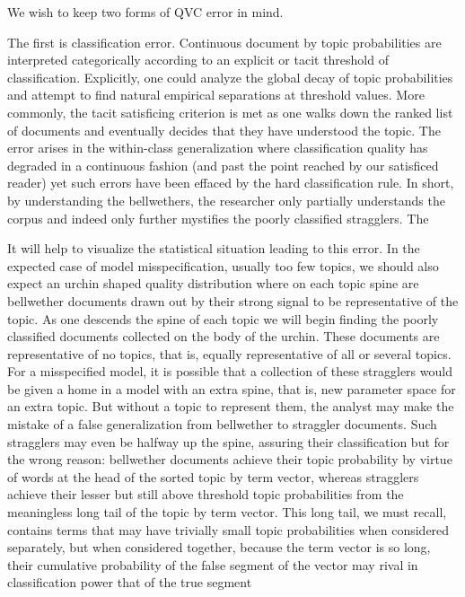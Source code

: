 \documentclass[]{book}
\theoremstyle{definition}
\theoremstyle{definition}
\theoremstyle{definition}
\theoremstyle{remark}
\begin{document}
We wish to keep two forms of QVC error in mind.

The first is classification error. Continuous document by topic
probabilities are interpreted categorically according to an explicit or
tacit threshold of classification. Explicitly, one could analyze the
global decay of topic probabilities and attempt to find natural
empirical separations at threshold values. More commonly, the tacit
satisficing criterion is met as one walks down the ranked list of
documents and eventually decides that they have understood the topic.
The error arises in the within-class generalization where classification
quality has degraded in a continuous fashion (and past the point reached
by our satisficed reader) yet such errors have been effaced by the hard
classification rule. In short, by understanding the bellwethers, the
researcher only partially understands the corpus and indeed only further
mystifies the poorly classified stragglers. The

It will help to visualize the statistical situation leading to this
error. In the expected case of model misspecification, usually too few
topics, we should also expect an urchin shaped quality distribution
where on each topic spine are bellwether documents drawn out by their
strong signal to be representative of the topic. As one descends the
spine of each topic we will begin finding the poorly classified
documents collected on the body of the urchin. These documents are
representative of no topics, that is, equally representative of all or
several topics. For a misspecified model, it is possible that a
collection of these stragglers would be given a home in a model with an
extra spine, that is, new parameter space for an extra topic. But
without a topic to represent them, the analyst may make the mistake of a
false generalization from bellwether to straggler documents. Such
stragglers may even be halfway up the spine, assuring their
classification but for the wrong reason: bellwether documents achieve
their topic probability by virtue of words at the head of the sorted
topic by term vector, whereas stragglers achieve their lesser but still
above threshold topic probabilities from the meaningless long tail of
the topic by term vector. This long tail, we must recall, contains terms
that may have trivially small topic probabilities when considered
separately, but when considered together, because the term vector is so
long, their cumulative probability of the false segment of the vector
may rival in classification power that of the true segment
\end{document}
